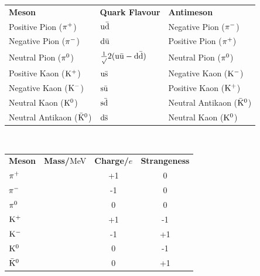     \begin{center}
    \begin{tabular}{l l l}
        \textbf{Meson}                    & \textbf{Quark Flavour}                                    & \textbf{Antimeson}                \\
        Positive Pion ($\pion[+]$)        & $\mesonquarks[u][d]$                                       & Negative Pion ($\pion[-]$)        \\
        Negative Pion ($\pion[-]$)        & $\mesonquarks[d][u]$                                       & Positive Pion ($\pion[+]$)        \\
        Neutral Pion ($\pion[0]$)         & $\overroot{2}(\mesonquarks[u][u]-\mesonquarks[d][d])$       & Neutral Pion ($\pion[0]$)         \\
        Positive Kaon ($\kaon[+]$)        & $\mesonquarks[u][s]$                                       & Negative Kaon ($\kaon[-]$)        \\
        Negative Kaon ($\kaon[-]$)        & $\mesonquarks[s][u]$                                       & Positive Kaon ($\kaon[+]$)        \\
        Neutral Kaon ($\kaon[0]$)         & $\mesonquarks[s][d]$                                       & Neutral Antikaon ($\antikaon[0]$) \\
        Neutral Antikaon ($\antikaon[0]$) & $\mesonquarks[d][s]$                                       & Neutral Kaon ($\kaon[0]$)
    \end{tabular} \\

    \begin{tabular}{l c c c}
        \textbf{Meson} & \textbf{Mass/}MeV & \textbf{Charge/}$e$ & \textbf{Strangeness} \\
        $\pion[+]$        &                   & +1                  & 0                 \\
        $\pion[-]$        &                   & -1                  & 0                 \\
        $\pion[0]$        &                   & 0                   & 0                 \\
        $\kaon[+]$        &                   & +1                  & -1                \\
        $\kaon[-]$        &                   & -1                  & +1                \\
        $\kaon[0]$        &                   & 0                   & -1                \\
        $\antikaon[0]$    &                   & 0                   & +1
    \end{tabular}
    \end{center}
    \newpage

